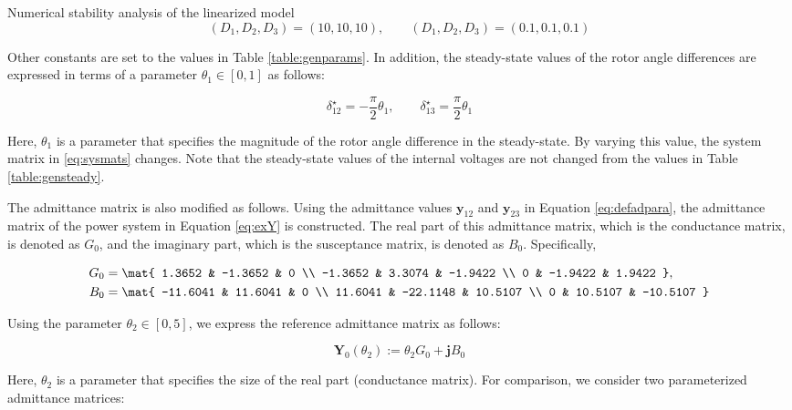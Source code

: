\documentclass[graybox, envcountchap]{svmult}
\begin{document}
\begin{example}{Numerical stability analysis of the linearized model}
\[
  (D_1,D_2,D_3)= (10,10,10), \qquad
  (D_1,D_2,D_3)= \left(0.1,0.1,0.1\right)
\]

Other constants are set to the values in Table \ref{table:genparams}. In
addition, the steady-state values of the rotor angle differences are expressed
in terms of a parameter $\theta_1 \in [0, 1]$ as follows:

\begin{equation}
  \delta_{12}^{\star}= - \frac{\pi}{2} \theta_1
  ,\qquad
  \delta_{13}^{\star}=  \frac{\pi}{2} \theta_1
\end{equation}

Here, $\theta_1$ is a parameter that specifies the magnitude of the rotor angle
difference in the steady-state. By varying this value, the system matrix in
\ref{eq:sysmats} changes. Note that the steady-state values of the internal
voltages are not changed from the values in Table \ref{table:gensteady}.

The admittance matrix is also modified as follows. Using the admittance values
$\bm{y}_{12}$ and $\bm{y}_{23}$ in Equation \ref{eq:defadpara}, the admittance
matrix of the power system in Equation \ref{eq:exY} is constructed. The real
part of this admittance matrix, which is the conductance matrix, is denoted as
$G_0$, and the imaginary part, which is the susceptance matrix, is denoted as
$B_0$. Specifically,

\begin{equation}
  \begin{aligned}
    G_0 &=
    \mat{
    1.3652 &  -1.3652 &     0 \\
    -1.3652 &   3.3074 &  -1.9422 \\
    0 &  -1.9422 &  1.9422
    }, \\
    B_0 & =
    \mat{
    -11.6041  & 11.6041    &    0 \\
      11.6041 &  -22.1148  &  10.5107 \\
      0  &  10.5107 &  -10.5107
    }
  \end{aligned}
\end{equation}

Using the parameter $\theta_2 \in [0,5]$, we express the reference admittance
matrix as follows:

\begin{equation}\label{eq:Y0theta2}
  \bm{Y}_0(\theta_2)
  :=
  \theta_2 G_0
  +
  \bm{j}  B_0
\end{equation}

Here, $\theta_2$ is a parameter that specifies the size of the real part
(conductance matrix). For comparison, we consider two parameterized admittance
matrices:


\end{example}
\end{document}

